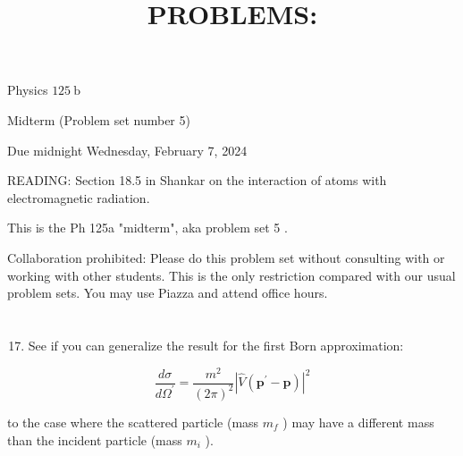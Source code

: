 \documentclass[12pt]{article}
\title{PROBLEMS: }
\author{}
\date{}
\begin{document}
\maketitle
Physics $125 \mathrm{~b}$

Midterm (Problem set number 5)

Due midnight Wednesday, February 7, 2024

READING: Section 18.5 in Shankar on the interaction of atoms with electromagnetic radiation.

This is the Ph 125a "midterm", aka problem set 5 .

Collaboration prohibited: Please do this problem set without consulting with or working with other students. This is the only restriction compared with our usual problem sets. You may use Piazza and attend office hours.
\section{}
\begin{enumerate}
  \setcounter{enumi}{16}
  \item See if you can generalize the result for the first Born approximation:
\end{enumerate}

$$
\frac{d \sigma}{d \Omega^{\prime}}=\frac{m^{2}}{(2 \pi)^{2}}\left|\hat{V}\left(\mathbf{p}^{\prime}-\mathbf{p}\right)\right|^{2}
$$

to the case where the scattered particle (mass $m_{f}$ ) may have a different mass than the incident particle (mass $m_{i}$ ).
\end{document}

